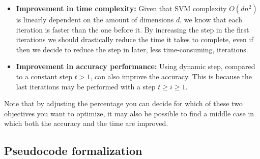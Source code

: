 \begin{itemize}
    \item \textbf{Improvement in time complexity:} Given that SVM complexity $O(dn^2)$ is lin\-ear\-ly dependent on the amount of dimensions $d$, we know that each iteration is faster than the one before it. By increasing the step in the first iterations we should drastically reduce the time it takes to complete, even if then we decide to reduce the step in later, less time-consuming, iterations.
    \item \textbf{Improvement in accuracy performance:} Using dynamic step, compared to a constant step $t > 1$, can also improve the accuracy. This is because the last iterations may be performed with a step $t \ge i \ge 1$.
\end{itemize}

Note that by adjusting the percentage you can decide for which of these two objectives you want to optimize, it may also be possible to find a middle case in which both the accuracy and the time are improved.

\subsection{Pseudocode formalization}

